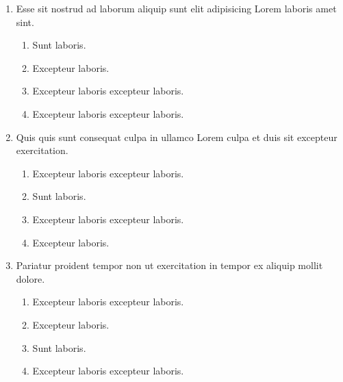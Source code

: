 \documentclass[a4paper,12pt]{article}
\begin{document}
\begin{enumerate}[label=\textbf{\arabic*.}]
\begin{multicols}{2}
\end{multicols}
\item Esse sit nostrud ad laborum aliquip sunt elit adipisicing Lorem laboris amet sint.
\begin{multicols}{2}
	\begin{enumerate}
		\item  Sunt laboris.
    
		\item  Excepteur laboris.
    
		\item  Excepteur laboris excepteur laboris.
  
		\item  Excepteur laboris excepteur laboris.
    
	\end{enumerate}

\end{multicols}
\item Quis quis sunt consequat culpa in ullamco Lorem culpa et duis sit excepteur exercitation.
\begin{multicols}{2}
	\begin{enumerate}
		\item  Excepteur laboris excepteur laboris.
  
		\item  Sunt laboris.
    
		\item  Excepteur laboris excepteur laboris.
    
		\item  Excepteur laboris.
    
	\end{enumerate}

\end{multicols}
\item Pariatur proident tempor non ut exercitation in tempor ex aliquip mollit dolore.
\begin{multicols}{2}
	\begin{enumerate}
		\item  Excepteur laboris excepteur laboris.
    
		\item  Excepteur laboris.
    
		\item  Sunt laboris.
    
		\item  Excepteur laboris excepteur laboris.
  
	\end{enumerate}


\end{multicols}
\end{enumerate}
\end{document}

